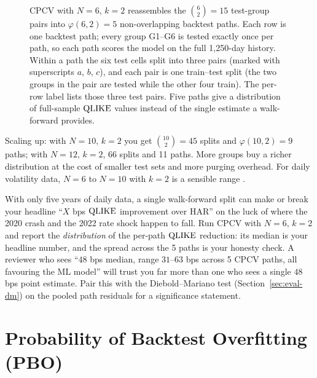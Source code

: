 \begin{figure}[ht]
\caption{CPCV with $N=6$, $k=2$ reassembles the $\binom{6}{2}=15$ test-group pairs into $\varphi(6,2)=5$ non-overlapping backtest paths.
Each row is one backtest path; every group G1--G6 is tested exactly once per path, so each path scores the model on the full 1{,}250-day history.
Within a path the six test cells split into three pairs (marked with superscripts $a$, $b$, $c$), and each pair is one train--test split (the two groups in the pair are tested while the other four train).
The per-row label lists those three test pairs.
Five paths give a distribution of full-sample $\operatorname{QLIKE}$ values instead of the single estimate a walk-forward provides.}
\label{fig:ch16-cpcv-paths}
\end{figure}

Scaling up: with $N=10$, $k=2$ you get $\binom{10}{2}=45$ splits and $\varphi(10,2)=9$ paths; with $N=12$, $k=2$, 66 splits and 11 paths.
More groups buy a richer distribution at the cost of smaller test sets and more purging overhead.
For daily volatility data, $N=6$ to $N=10$ with $k=2$ is a sensible range \citep{LopezdePrado2018}.

\begin{projectconnection}
With only five years of daily data, a single walk-forward split can make or break your headline ``$X$ bps $\operatorname{QLIKE}$ improvement over HAR'' on the luck of where the 2020 crash and the 2022 rate shock happen to fall.
Run CPCV with $N=6$, $k=2$ and report the \emph{distribution} of the per-path $\operatorname{QLIKE}$ reduction: its median is your headline number, and the spread across the 5 paths is your honesty check.
A reviewer who sees ``$48$ bps median, range $31$--$63$ bps across 5 CPCV paths, all favouring the ML model'' will trust you far more than one who sees a single $48$ bps point estimate.
Pair this with the Diebold--Mariano test (Section~\ref{sec:eval-dm}) on the pooled path residuals for a significance statement.
\end{projectconnection}


\section{Probability of Backtest Overfitting (PBO)}
\label{sec:ch16:pbo}

